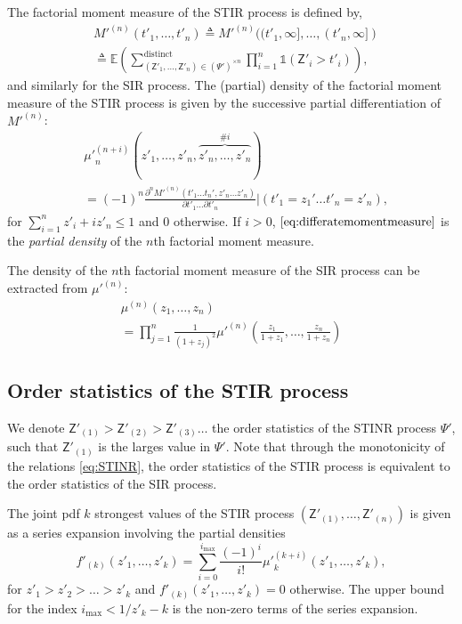 \documentclass[lettersize,journal]{IEEEtran}
\begin{document}
 The factorial moment measure of the STIR process is defined by,
    \begin{align}
          &M'^{(n)}(t'_1,\dots,t'_n) \triangleq M'^{(n)}((t'_1,\infty],\dots,(t'_n,\infty]) \nonumber \\
              &\triangleq \mathbb{E} \left( \sum^{\text{distinct}}_{\left(\mathsf{Z}'_1, \dots, \mathsf{Z}'_n \right) \in (\Psi')^{\times n}} \prod_{i=1}^n \mathds{1}(\mathsf{Z}'_i >t'_i)\right),
    \end{align}
    and similarly for the SIR process.
 The (partial) density of the factorial moment measure of the STIR process is given by the successive partial differentiation of $M'^{(n)}$:
    \begin{align}
      \label{eq:differatemomentmeasure}
     &{\mu'}_n^{(n+i)}(z'_1,\dots,z'_n,\overbrace{z'_n,\dots,z'_n}^{\#i}) \nonumber \\&= (-1)^n \frac{\partial^n M'^{(n)}(t'_1\dots t_n',z'_n \dots z'_n) }{\partial t'_1 \dots \partial t'_n} |(t'_1=z_1'\dots t'_n=z'_n),
    \end{align}
    for $\sum_{i=1}^n z'_i + i z'_n\leq 1$ and $0$ otherwise.  If $i >0$, $\eqref{eq:differatemomentmeasure}$ is the \textit{partial density} of the $n$th factorial moment measure.

    The density of the $n$th factorial moment measure of the SIR process can be extracted from $\mu'^{(n)}$:
    \begin{align}
      \label{eq:densitySINR}
      &\mu^{(n)}(z_1,\dots,z_n)&\\
      &= \prod_{j=1}^n\frac{1}{(1+z_j)^2}\mu'^{(n)}\left(\frac{z_1}{1+z_1},\dots,\frac{z_n}{1+z_n}\right)
    \end{align}

    
  
\subsection{Order statistics of the STIR process}
We denote $\mathsf{Z}'_{(1)}>\mathsf{Z}'_{(2)} >\mathsf{Z}'_{(3)} \dots$ the order statistics of the STINR process $\Psi'$, such that $\mathsf{Z}'_{(1)}$ is the larges value in $\Psi'$. Note that through the monotonicity of the relations \eqref{eq:STINR}, the order statistics of the STIR process is equivalent to the order statistics of the SIR process.

The joint pdf $k$ strongest values of the STIR process $(\mathsf{Z}'_{(1)}, \dots, \mathsf{Z}'_{(n)})$ is given as a series expansion involving the partial densities
\begin{equation}
  \label{eq:jointprobability}
  f'_{(k)}(z'_1,\dots,z'_k)= \sum^{i_{\text{max}}}_{i=0}\frac{(-1)^i}{i!}{\mu'}_k^{(k+i)}(z'_1,\dots,z'_k),
\end{equation}
for $z'_1>z'_2>\dots>z'_k$ and $f'_{(k)}(z'_1,\dots,z'_k) =0 $ otherwise. The upper bound for the index $i_{\text{max}}<1/z'_k-k$ is the non-zero terms of the series expansion. 
\end{document}
